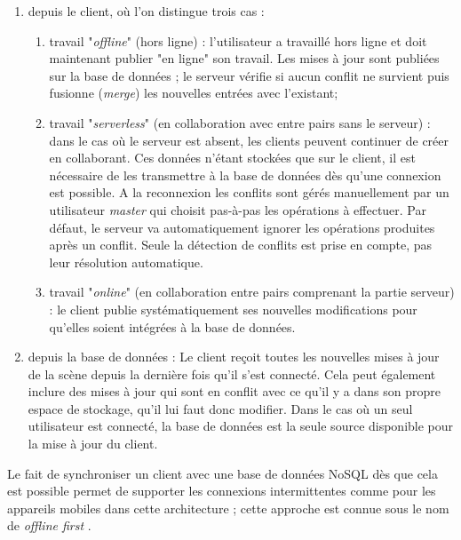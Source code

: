 \begin{enumerate}
	\item depuis le client, où l'on distingue trois cas :
	\begin{enumerate}
		\item travail "\textit{offline}" (hors ligne) : l'utilisateur a travaillé hors ligne et 
		doit maintenant publier "en ligne" son travail. Les mises à jour sont publiées 
		sur la base de données ; le serveur vérifie si aucun conflit ne survient puis 
		fusionne (\textit{merge}) les nouvelles entrées avec l'existant; 
		
		\item travail "\textit{serverless}" (en collaboration avec entre pairs sans le 
		serveur) : dans le cas où le serveur est absent, les clients peuvent continuer 
		de créer en collaborant. Ces données n'étant stockées que sur le client, il est 
		nécessaire de les transmettre à la base de données dès qu'une connexion 
		est possible. A la reconnexion les conflits sont gérés manuellement par un 
		utilisateur \textit{master} qui choisit pas-à-pas les opérations à effectuer. Par 
		défaut, le serveur va automatiquement ignorer les opérations produites après 
		un conflit. Seule la détection de conflits est prise en 
		compte, pas leur résolution automatique.
		
		\item travail "\textit{online}" (en collaboration entre pairs comprenant la partie
		serveur) : le client publie systématiquement ses 
		nouvelles modifications pour qu'elles soient intégrées à la base de données.
	\end{enumerate}
	\item depuis la base de données :
	Le client reçoit toutes les nouvelles mises à jour de la scène depuis la dernière 
	fois qu'il s'est connecté. Cela peut également inclure des mises à jour qui sont 
	en conflit avec ce qu'il y a dans son propre espace de stockage, qu'il lui faut 
	donc modifier.
	Dans le cas où un seul utilisateur est connecté, la base de données est la 
	seule source disponible pour la mise à jour du client. 
\end{enumerate}


Le fait de synchroniser un client avec une base de données NoSQL dès que cela 
est possible permet de supporter les connexions intermittentes comme pour les 
appareils mobiles dans cette architecture ; cette approche est connue sous le nom 
de \og\textit{offline first}\fg{} \cite{Gadea2016}.

